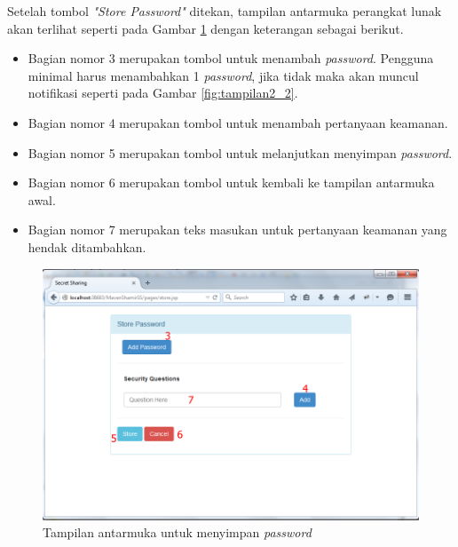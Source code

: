 Setelah tombol \textit{"Store Password"} ditekan, tampilan antarmuka perangkat lunak akan terlihat seperti pada Gambar \ref{fig:tampilan2} dengan keterangan sebagai berikut.

\begin{itemize}
	\item Bagian nomor 3 merupakan tombol untuk menambah \textit{password}. Pengguna minimal harus menambahkan 1 \textit{password}, jika tidak maka akan muncul notifikasi seperti pada Gambar \ref{fig:tampilan2_2}.
	\item Bagian nomor 4 merupakan tombol untuk menambah pertanyaan keamanan.
	\item Bagian nomor 5 merupakan tombol untuk melanjutkan menyimpan \textit{password}.
	\item Bagian nomor 6 merupakan tombol untuk kembali ke tampilan antarmuka awal.
	\item Bagian nomor 7 merupakan teks masukan untuk pertanyaan keamanan yang hendak ditambahkan.
\end{itemize}

\begin{figure}[H]
	\includegraphics[scale=0.5]{Gambar/tampilan2}
	\centering
	\caption{Tampilan antarmuka untuk menyimpan \textit{password}}\label{fig:tampilan2}
\end{figure}

